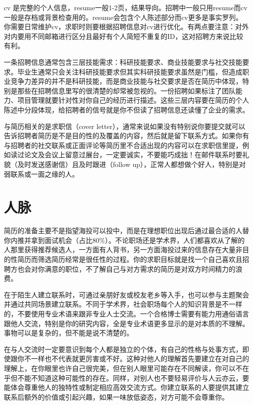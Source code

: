 \documentclass[]{tufte-book}
\begin{document}
cv 是完整的个人信息，resume一般1-2页，结果导向。招聘中一般只用resume而cv一般是存档或背景检查用的。resume会包含个人陈述部分而cv更多是事实罗列。你需要日常维护cv，求职时则要根据招聘信息对cv进行优化。有两点要注意：对外对内要用不同邮箱进行区分且最好有个人简短不重复的ID，这对招聘方来说比较有利。

一条招聘信息通常包含三层技能需求：科研技能要求、商业技能要求与社交技能要求。毕业生通常只会关注科研技能要求但其实科研技能要求虽然是门槛，但造成职业竞争力差异的并不是科研技能，而是商业技能与社交要求是否在简历中体现，特别是那些在招聘信息里写的很清楚的却常被忽视的。一份招聘如果标注了团队能力、项目管理就要针对性对你自己的经历进行描述。这些三层内容要在简历的个人陈述中分段体现，给招聘者的信号就是你不但读了招聘信息还读懂了企业的需求。

与简历相关的是求职信（cover letter），通常来说如果没有特别说你要提交就可以告诉招聘者简历是不是目的性的及覆盖的内容，然后就是留下联系方式。如果你有与招聘者的社交联系或正面评论等简历里不合适出现的内容可以在求职信里提，例如读过论文及会议上留意过展台，一定要诚实，不要能巧成拙！在邮件联系时要礼貌（及时发送感谢信）且及时跟进（follow up），正常人都想做个好人，特别是对弱联系或一面之缘的人。

\hypertarget{ux4ebaux8109}{%
\section{人脉}\label{ux4ebaux8109}}

简历的准备主要不是指望海投可以投中，而是在理想职位出现后通过最合适的人替你内推并拿到面试机会（占比80\%）。不论职场还是学术界，人们都喜欢从了解的人那里获得推荐候选人，一方面有人背书，另一方面海投过来的信息存在大量非目的性简历而筛选简历经常是很任性的过程。你的求职目标就是找一个自己喜欢且招聘方也会对你满意的职位，不了解自己与对方需求的简历是对双方时间精力的浪费。

在于陌生人建立联系时，可通过亲朋好友或校友老乡等入手，也可以参与主题聚会并通过共同场景建立联系。不同于学术界，社会职场每个人的知识背景是不一样的，不要使用专业术语来跟非专业人士交流。一个合格博士需要有能力用通俗语言跟他人交流，特别是你的研究内容，全是专业术语更多显示的是对本质的不理解。事物可以是复杂的，但不能是说不清楚的。

在与人交流时一定要意识到每个人都是独立的个体，有自己的性格与处事方式，即使跟你不一样也不代表就更厉害或不好。这种对他人的理解首先要建立在对自己的理解上，在你眼里也许自己很完美，但在别人眼里可能存在不同解读，你可以不在乎但不能不知道这种可能性的存在。同样，对别人也不要轻易评价与人云亦云，要能体会尊重他人的独特性或制定相应高效交流方式。你建立联系的人要提供其建立联系后额外的价值或引起兴趣，如果一味放低姿态，对方可能不会尊重你。
\end{document}
